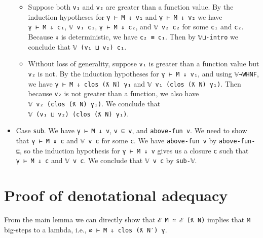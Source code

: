 \begin{itemize}
  \begin{itemize}
  \item
    Suppose both \texttt{v₁} and \texttt{v₂} are greater than a function
    value. By the induction hypotheses for \texttt{γ\ ⊢\ M\ ↓\ v₁} and
    \texttt{γ\ ⊢\ M\ ↓\ v₂} we have
    \texttt{γ\textquotesingle{}\ ⊢\ M\ ⇓\ c₁}, \texttt{𝕍\ v₁\ c₁},
    \texttt{γ\textquotesingle{}\ ⊢\ M\ ⇓\ c₂}, and \texttt{𝕍\ v₂\ c₂}
    for some \texttt{c₁} and \texttt{c₂}. Because \texttt{⇓} is
    deterministic, we have \texttt{c₂\ ≡\ c₁}. Then by \texttt{𝕍⊔-intro}
    we conclude that \texttt{𝕍\ (v₁\ ⊔\ v₂)\ c₁}.
  \item
    Without loss of generality, suppose \texttt{v₁} is greater than a
    function value but \texttt{v₂} is not. By the induction hypotheses
    for \texttt{γ\ ⊢\ M\ ↓\ v₁}, and using \texttt{𝕍→WHNF}, we have
    \texttt{γ\textquotesingle{}\ ⊢\ M\ ⇓\ clos\ (ƛ\ N)\ γ₁} and
    \texttt{𝕍\ v₁\ (clos\ (ƛ\ N)\ γ₁)}. Then because \texttt{v₂} is not
    greater than a function, we also have
    \texttt{𝕍\ v₂\ (clos\ (ƛ\ N)\ γ₁)}. We conclude that
    \texttt{𝕍\ (v₁\ ⊔\ v₂)\ (clos\ (ƛ\ N)\ γ₁)}.
  \end{itemize}
\item
  Case \texttt{sub}. We have \texttt{γ\ ⊢\ M\ ↓\ v},
  \texttt{v\textquotesingle{}\ ⊑\ v}, and
  \texttt{above-fun\ v\textquotesingle{}}. We need to show that
  \texttt{γ\textquotesingle{}\ ⊢\ M\ ⇓\ c} and
  \texttt{𝕍\ v\textquotesingle{}\ c} for some \texttt{c}. We have
  \texttt{above-fun\ v} by \texttt{above-fun-⊑}, so the induction
  hypothesis for \texttt{γ\ ⊢\ M\ ↓\ v} gives us a closure \texttt{c}
  such that \texttt{γ\textquotesingle{}\ ⊢\ M\ ⇓\ c} and
  \texttt{𝕍\ v\ c}. We conclude that \texttt{𝕍\ v\textquotesingle{}\ c}
  by \texttt{sub-𝕍}.
\end{itemize}

\hypertarget{proof-of-denotational-adequacy}{%
\section{Proof of denotational
adequacy}\label{proof-of-denotational-adequacy}}

From the main lemma we can directly show that
\texttt{ℰ\ M\ ≃\ ℰ\ (ƛ\ N)} implies that \texttt{M} big-steps to a
lambda, i.e., \texttt{∅\ ⊢\ M\ ⇓\ clos\ (ƛ\ N′)\ γ}.

